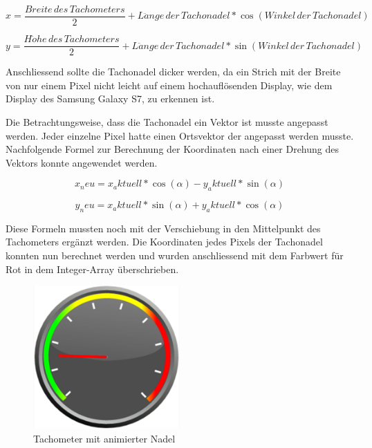 \begin{equation}
	x = \frac{Breite\, des\, Tachometers}{2} + L\ddot{a}nge\, der\, Tachonadel * \cos(Winkel\, der\, Tachonadel)
\end{equation}

\begin{equation}
	y = \frac{H\ddot{o}he\, des\, Tachometers}{2} + L\ddot{a}nge\, der\, Tachonadel * \sin(Winkel\, der\, Tachonadel)
\end{equation}

Anschliessend sollte die Tachonadel dicker werden, da ein Strich mit der Breite von nur einem Pixel nicht leicht auf einem hochauflösenden Display, wie dem Display des Samsung Galaxy S7, zu erkennen ist.

Die Betrachtungsweise, dass die Tachonadel ein Vektor ist musste angepasst werden. Jeder einzelne Pixel hatte einen Ortsvektor der angepasst werden musste. Nachfolgende Formel zur Berechnung der Koordinaten nach einer Drehung des Vektors konnte angewendet werden.

\begin{equation}
	x_neu = x_aktuell * \cos(\alpha) - y_aktuell * \sin(\alpha)
\end{equation}

\begin{equation}
	y_neu = x_aktuell * \sin(\alpha) + y_aktuell * \cos(\alpha)
\end{equation}

Diese Formeln mussten noch mit der Verschiebung in den Mittelpunkt des Tachometers ergänzt werden. Die Koordinaten jedes Pixels der Tachonadel konnten nun berechnet werden und wurden anschliessend mit dem Farbwert für Rot in dem Integer-Array überschrieben.

\begin{figure}[ht]
    \includegraphics[width=0.5\textwidth]{3Vorgehen/imag/tachometer_mit_nadel.png}
    \caption{Tachometer mit animierter Nadel}
	\label{tachometer_mit_nadel} 
\end{figure}

